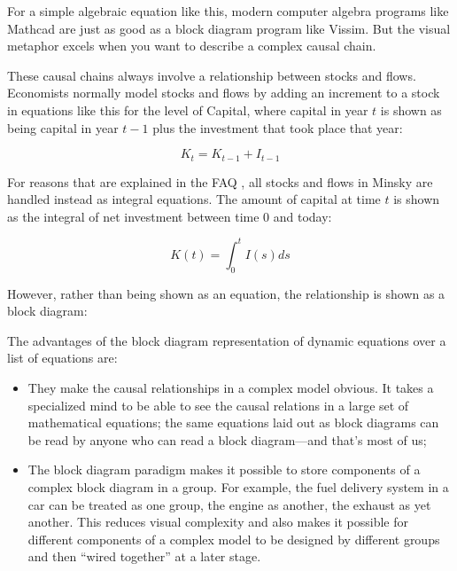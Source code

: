 \begin{center}
\end{center}

For a simple algebraic equation like this, modern computer algebra
programs like Mathcad are just as good as a block diagram program like
Vissim. But the visual metaphor excels when you want to describe a
complex causal chain.


These causal chains always involve a relationship between stocks and
flows. Economists normally model stocks and flows by adding an
increment to a stock in equations like this for the level of Capital,
where capital in year $t$ is shown as being capital in year $t-1$ plus
the investment that took place that year:

\begin{displaymath}
K_t=K_{t-1}+I_{t-1}
\end{displaymath}

For reasons that are explained in the FAQ , all stocks and flows in Minsky are
handled instead as integral equations. The amount of capital at time
$t$ is shown as the integral of net investment between time 0 and
today:

\begin{displaymath}
K(t)=\int_0^t I(s)ds
\end{displaymath}

However, rather than being shown as an equation, the relationship is shown as a block diagram:

\begin{center}
\end{center}

The advantages of the block diagram representation of dynamic equations
over a list of equations are:
\begin{itemize}
\item    They make the causal relationships in a complex model
  obvious. It takes a specialized mind to be able to see the causal
  relations in a large set of mathematical equations; the same
  equations laid out as block diagrams can be read by anyone who can read
  a block diagram---and that's most of us;
\item The block diagram paradigm makes it possible to store components of
  a complex block diagram in a group. For example, the fuel delivery
  system in a car can be treated as one group, the engine as another,
  the exhaust as yet another. This reduces visual complexity and also
  makes it possible for different components of a complex model to be
  designed by different groups and then ``wired together'' at a later
  stage.
\end{itemize}


